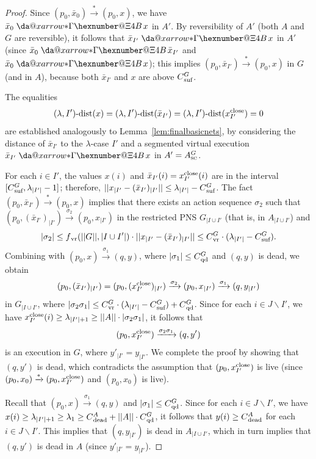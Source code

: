 \documentclass[11pt,a4paper]{amsart}
\makeatletter
\newcommand{\step}[1]{\mathrel{\xrightarrow{#1}}}
\newcommand{\reach}{\step{*}}
\newcommand{\virtual}[1]{\mathrel{\xdashrightarrow{#1}}\hspace{-0.3em}}
\newcommand{\vreach}{\virtual{*}}
\newcommand{\dist}[3]{(#1,#2)\text{-dist}(#3)}
\newcommand{\nnorm}[1]{||#1||}
\newcommand{\vr}{{}_\textnormal{vr}}
\newcommand{\dead}{{}_\textnormal{dead}}
\newcommand{\suf}{{}_\textnormal{suf}}
\newcommand{\close}{\textnormal{close}}
\newcommand{\qd}{{}_\textnormal{qd}}
\newcommand{\ASC}{A_{\textsc{sc}}}
\newcommand{\restr}[1]{_{|{#1}}}
\newcommand*{\da@rightarrow}{\mathchar"0\hexnumber@\symAMSa 4B }
\newcommand*{\xdashrightarrow}[2][]{%
  \mathrel{%
    \mathpalette{\da@xarrow{#1}{#2}{}\da@rightarrow{\,}{}}{}%
  }%
}
\newcommand*{\da@xarrow}[7]{%
  \sbox0{$\ifx#7\scriptstyle\scriptscriptstyle\else\scriptstyle\fi#5#1#6\m@th$}%
  \sbox2{$\ifx#7\scriptstyle\scriptscriptstyle\else\scriptstyle\fi#5#2#6\m@th$}%
  \sbox4{$#7\dabar@\m@th$}%
  \dimen@=\wd0 %
  \ifdim\wd2 >\dimen@
    \dimen@=\wd2 %
  \fi
  \count@=2 %
  \def\da@bars{\dabar@\dabar@}%
  \@whiledim\count@\wd4<\dimen@\do{%
    \advance\count@\@ne
    \expandafter\def\expandafter\da@bars\expandafter{%
      \da@bars
      \dabar@ 
    }%
  }%
  \mathrel{#3}%
  \mathrel{%
    \mathop{\da@bars}\limits
    \ifx\\#1\\%
    \else
      _{\copy0}%
    \fi
    \ifx\\#2\\%
    \else
      ^{\copy2}%
    \fi
  }%
  \mathrel{#4}%
}
\let\origtextsc\textsc
\renewcommand{\textsc}[1]{\textnormal{\origtextsc{#1}}}
\theoremstyle{plain}
\theoremstyle{definition}
\theoremstyle{defC}
\theoremstyle{thmC}
\makeatother
\begin{document}
\begin{proof}
	Since $(p_0,\bar{x}_0)\reach (p_0,x)$, we have
	$\bar{x}_0\vreach x$ in $A'$. By reversibility of $A'$
	(both $A$ and $G$ are reversible), it follows that
	$\bar{x}_{I'}\vreach x$ in $A'$ (since $\bar{x}_0\vreach
	\bar{x}_{I'}$ and $\bar{x}_0\vreach x$); this implies
	$(p_0,\bar{x}_{I'})\reach (p_0,x)$ in $G$ (and in $A$), because
	both $\bar{x}_{I'}$ and $x$ are above $C\suf^G$.

The equalities 
\[\dist{\lambda}{I'}{x}=\dist{\lambda}{I'}{\bar{x}_{I'}}=\dist{\lambda}{I'}{x^\close_{I'}}=0\] 
are established analogously to Lemma~\ref{lem:finalbasicnets},
by considering the distance of $\bar{x}_{I'}$ to the $\lambda$-case $I'$
	and a segmented virtual execution $\bar{x}_{I'}\vreach x$ in
	$A'=\ASC^G$.

For each $i\in I'$, the values $x(i)$ and
$\bar{x}_{I'}(i)=x^\close_{I'}(i)$ are in the interval
$[C\suf^G,\lambda_{|I'|}-1]$; therefore, 
$\nnorm{x\restr{I'}-(\bar{x}_{I'})\restr{I'}}\leq \lambda_{|I'|}-C\suf^G$.
The fact 
$(p_0,\bar{x}_{I'})\reach (p_0,x)$ implies that
there exists an action sequence $\sigma_2$ such that 
$(p_0,(\bar{x}_{I'})\restr{I'})\step{\sigma_2} (p_0,x\restr{I'})$ in
the restricted PNS $G\restr{I\cup I'}$ (that is, in $A\restr{I\cup I'}$)
and
\[|\sigma_2|\leq f\vr(\nnorm{G},|I\cup I'|)\cdot
\nnorm{x\restr{I'}-(\bar{x}_{I'})\restr{I'}}\leq C\vr^{G}\cdot
(\lambda_{|I'|}-C\suf^G).\]
Combining with $(p_0,x)\step{\sigma_1}(q,y)$, where $|\sigma_1|\leq
C\qd^G$ and $(q,y)$ is dead, we obtain
\[(p_0,(\bar{x}_{I'})\restr{I'})=(p_0,(x^\close_{I'})\restr{I'})\step{\sigma_2}
(p_0,x\restr{I'})\step{\sigma_1}(q,y\restr{I'})\]
in $G\restr{I\cup I'}$, where $|\sigma_2\sigma_1|\leq C\vr^{G}\cdot
(\lambda_{|I'|}-C\suf^G)+C\qd^G$.
Since for each $i\in J\smallsetminus I'$, we have
$x^\close_{I'}(i)\geq\lambda_{|I'|+1}\geq \nnorm{A}\cdot
|\sigma_2\sigma_1|$, it follows that 
\[(p_0,x^\close_{I'})\step{\sigma_2\sigma_1}(q,y')\]
is an execution in $G$, where $y'\restr{I'}=y\restr{I'}$.
We complete the proof by showing that $(q,y')$ is dead, which
contradicts the assumption that $(p_0,x^\close_{I'})$ is live (since 
$(p_0,x_0)\reach(p_0,x^\close_{I'})$ and $(p_0,x_0)$ is live).

Recall that $(p_0,x)\step{\sigma_1}(q,y)$ and $|\sigma_1|\leq C\qd^G$.
Since for each $i\in J\smallsetminus I'$, we have $x(i)\geq
\lambda_{|I'|+1}\geq \lambda_1\geq C\dead^A+ \nnorm{A}\cdot C\qd^G$, it follows that 
$y(i)\geq C\dead^A$ for each  $i\in J\smallsetminus I'$. This implies
that $(q,y\restr{I'})$ is dead in $A\restr{I\cup I'}$, which in turn
implies that $(q,y')$ is dead in $A$ (since
$y'\restr{I'}=y\restr{I'}$).
\end{proof}
\end{document}
